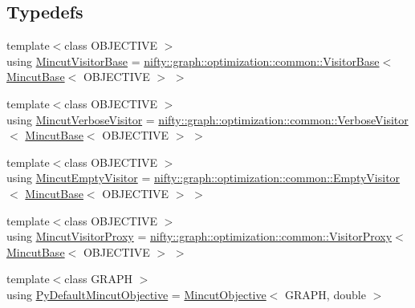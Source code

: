 \subsection*{Typedefs}
\begin{DoxyCompactItemize}
\item 
{\footnotesize template$<$class O\+B\+J\+E\+C\+T\+I\+V\+E $>$ }\\using \hyperlink{namespacenifty_1_1graph_1_1optimization_1_1mincut_a95cebea00c03e9d82bf37342468c1fd9}{Mincut\+Visitor\+Base} = \hyperlink{classnifty_1_1graph_1_1optimization_1_1common_1_1VisitorBase}{nifty\+::graph\+::optimization\+::common\+::\+Visitor\+Base}$<$ \hyperlink{classnifty_1_1graph_1_1optimization_1_1mincut_1_1MincutBase}{Mincut\+Base}$<$ O\+B\+J\+E\+C\+T\+I\+V\+E $>$ $>$
\item 
{\footnotesize template$<$class O\+B\+J\+E\+C\+T\+I\+V\+E $>$ }\\using \hyperlink{namespacenifty_1_1graph_1_1optimization_1_1mincut_aa2aaddaf5d6cc62c6016cfafb267afdd}{Mincut\+Verbose\+Visitor} = \hyperlink{classnifty_1_1graph_1_1optimization_1_1common_1_1VerboseVisitor}{nifty\+::graph\+::optimization\+::common\+::\+Verbose\+Visitor}$<$ \hyperlink{classnifty_1_1graph_1_1optimization_1_1mincut_1_1MincutBase}{Mincut\+Base}$<$ O\+B\+J\+E\+C\+T\+I\+V\+E $>$ $>$
\item 
{\footnotesize template$<$class O\+B\+J\+E\+C\+T\+I\+V\+E $>$ }\\using \hyperlink{namespacenifty_1_1graph_1_1optimization_1_1mincut_aac5eb28bbe885fb25185ac51f2afca82}{Mincut\+Empty\+Visitor} = \hyperlink{classnifty_1_1graph_1_1optimization_1_1common_1_1EmptyVisitor}{nifty\+::graph\+::optimization\+::common\+::\+Empty\+Visitor}$<$ \hyperlink{classnifty_1_1graph_1_1optimization_1_1mincut_1_1MincutBase}{Mincut\+Base}$<$ O\+B\+J\+E\+C\+T\+I\+V\+E $>$ $>$
\item 
{\footnotesize template$<$class O\+B\+J\+E\+C\+T\+I\+V\+E $>$ }\\using \hyperlink{namespacenifty_1_1graph_1_1optimization_1_1mincut_a6e8ff5bbfb5e0e5fcce56edb7420ebb3}{Mincut\+Visitor\+Proxy} = \hyperlink{classnifty_1_1graph_1_1optimization_1_1common_1_1VisitorProxy}{nifty\+::graph\+::optimization\+::common\+::\+Visitor\+Proxy}$<$ \hyperlink{classnifty_1_1graph_1_1optimization_1_1mincut_1_1MincutBase}{Mincut\+Base}$<$ O\+B\+J\+E\+C\+T\+I\+V\+E $>$ $>$
\item 
{\footnotesize template$<$class G\+R\+A\+P\+H $>$ }\\using \hyperlink{namespacenifty_1_1graph_1_1optimization_1_1mincut_a59ae7c3445ccd2a6626257d89b89cd9c}{Py\+Default\+Mincut\+Objective} = \hyperlink{classnifty_1_1graph_1_1optimization_1_1mincut_1_1MincutObjective}{Mincut\+Objective}$<$ G\+R\+A\+P\+H, double $>$
\end{DoxyCompactItemize}
